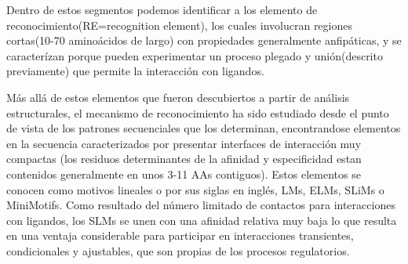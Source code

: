 
Dentro de estos segmentos podemos identificar a los elemento de reconocimiento(RE=recognition element)\cite{mohan2006analysis,vacic2007characterization,oldfield2005coupled}, los cuales involucran regiones cortas(10-70 aminoácidos de largo) 
con propiedades generalmente anfipáticas, y se caracterízan porque pueden experimentar un proceso plegado y unión(descrito previamente) que permite la interacción con ligandos.  
% 

Más allá de estos elementos que fueron descubiertos a partir de análisis estructurales, el mecanismo de reconocimiento ha sido estudiado desde el punto de vista de los patrones secuenciales que los determinan, 
encontrandose elementos en la secuencia caracterizados por presentar interfaces
de interacción muy compactas (los residuos determinantes de la afinidad y especificidad estan contenidos generalmente en unos 3-11 AAs contiguos).
Estos elementos se conocen como motivos lineales o por sus siglas en inglés, LMs, ELMs, SLiMs o MiniMotifs\cite{davey2012attributes}. 
Como resultado del número limitado de contactos para interacciones con ligandos, los SLMs se unen con una afinidad relativa muy baja lo que resulta en una ventaja considerable 
para participar en interacciones transientes, condicionales y  ajustables, que son propias de los procesos regulatorios.

